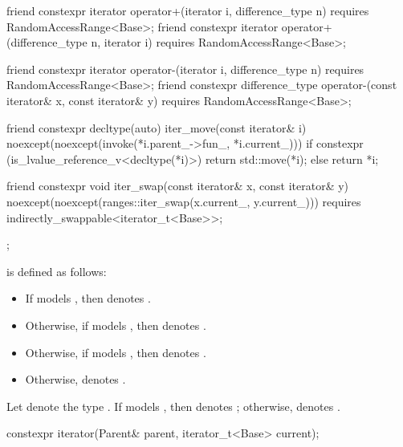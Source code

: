 \begin{codeblock}
{{    friend constexpr iterator operator+(iterator i, difference_type n)
      requires RandomAccessRange<Base>;
    friend constexpr iterator operator+(difference_type n, iterator i)
      requires RandomAccessRange<Base>;

    friend constexpr iterator operator-(iterator i, difference_type n)
      requires RandomAccessRange<Base>;
    friend constexpr difference_type operator-(const iterator& x, const iterator& y)
      requires RandomAccessRange<Base>;

    friend constexpr decltype(auto) iter_move(const iterator& i)
      noexcept(noexcept(invoke(*i.parent_->fun_, *i.current_)))
    {
      if constexpr (is_lvalue_reference_v<decltype(*i)>)
        return std::move(*i);
      else
        return *i;
    }

    friend constexpr void iter_swap(const iterator& x, const iterator& y)
      noexcept(noexcept(ranges::iter_swap(x.current_, y.current_)))
      requires indirectly_swappable<iterator_t<Base>>;
  };
}
\end{codeblock}

\pnum
{} is defined as follows:
\begin{itemize}
\item If  models , then
 denotes .

\item Otherwise, if  models , then
 denotes .

\item Otherwise, if  models , then
 denotes .

\item Otherwise,  denotes .
\end{itemize}

\pnum
Let  denote the type
.
If  models ,
then  denotes
; otherwise,
 denotes .

\begin{itemdecl}
constexpr iterator(Parent& parent, iterator_t<Base> current);
\end{itemdecl}


